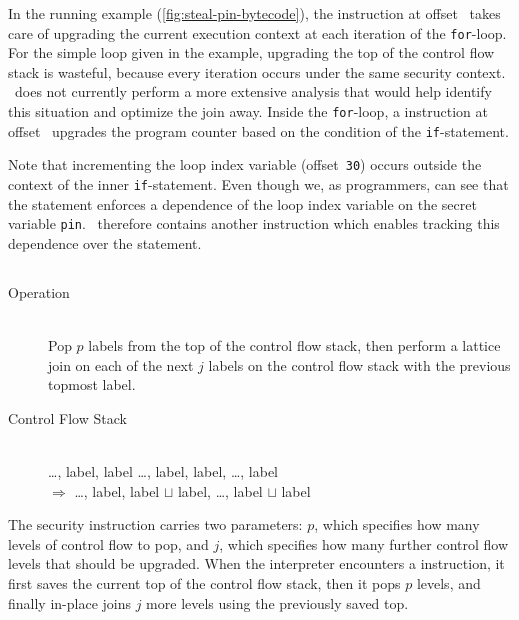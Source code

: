 In the running example (\autoref{fig:steal-pin-bytecode}), the \join instruction at offset~ takes care of upgrading the current execution context at each iteration of the \texttt{for}-loop.
For the simple loop given in the example, upgrading the top of the control flow stack is wasteful, because every iteration occurs under the same security context.
\FlowCore\ does not currently perform a more extensive analysis that would help identify this situation and optimize the join away.
Inside the \texttt{for}-loop, a \join instruction at offset~ upgrades the program counter based on the condition of the \texttt{if}-statement.

Note that incrementing the loop index variable (offset~\texttt{30}) occurs outside the context of the inner \texttt{if}-statement.
Even though we, as programmers, can see that the  statement enforces a dependence of the loop index variable on the secret variable \texttt{pin}.
\FlowCore\ therefore contains another instruction which enables tracking this dependence over the  statement.

\subsection{\popj}

\begin{samepage}
\begin{description}
\item[Operation] \hfill \\
 Pop $p$ labels from the top of the control flow stack, then perform a lattice join on each of the next $j$ labels on the control flow stack with the previous topmost label.
\item[Control Flow Stack] \hfill \\
  \ldots, label, label \ldots, label, label, \ldots, label\\
 $\Rightarrow$
 \ldots, label, label $\sqcup$ label, \ldots, label $\sqcup$ label
\end{description}
\end{samepage}

The \popj security instruction carries two parameters: $p$, which specifies how many levels of control flow to pop, and $j$, which specifies how many further control flow levels that should be upgraded.
When the interpreter encounters a \popj instruction, it first saves the current top of the control flow stack, then it pops $p$ levels, and finally in-place joins $j$ more levels using the previously saved top.

